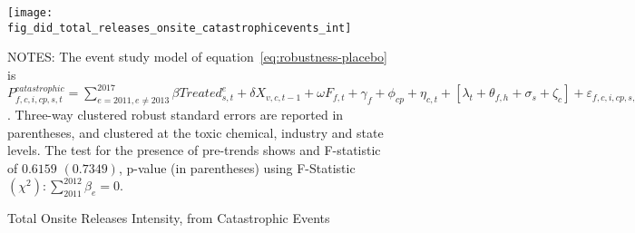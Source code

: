 \begin{figure}[H]
    \centering
    \texttt{[image: fig\_did\_total\_releases\_onsite\_catastrophicevents\_int]}
    \caption{Total Onsite Releases Intensity, from Catastrophic Events}
    \label{fig:baseline-placebo}
    \begin{minipage}{18cm}
        \vspace{0.05in}
        NOTES: The event study model of equation~\ref{eq:robustness-placebo} is $P_{f,c,i,cp,s,t}^{catastrophic} = \sum_{{e = 2011},{e \neq 2013}}^{2017} \beta Treated_{s,t}^e + \delta X_{v,c,t-1} + \omega F_{f,t} + \gamma_{f} + \phi_{cp} + \eta_{c,t} + \left[\lambda_{t} + \theta_{f,h} + \sigma_{s} + \zeta_{c} \right] + \varepsilon_{f,c,i,cp,s,t}$. Three-way clustered robust standard errors are reported in parentheses, and clustered at the toxic chemical, industry and state levels. The test for the presence of pre-trends shows and F-statistic of $0.6159$ $(0.7349)$, p-value (in parentheses) using F-Statistic $(\chi^2): \sum_{2011}^{2012} \beta_{e} = 0$.
    \end{minipage}
\end{figure}